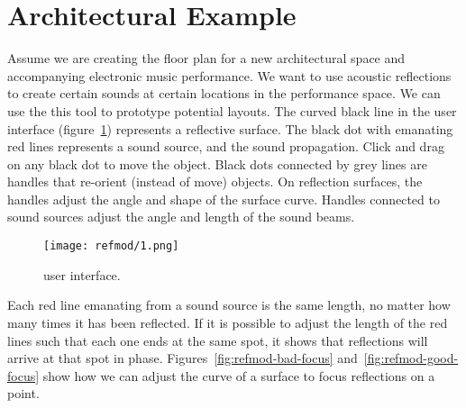 \section{ Architectural Example}
\label{sec:refmod-user-interf}
Assume we are creating the floor plan for a new architectural space
and accompanying electronic music performance. We want to use acoustic
reflections to create certain sounds at certain locations in the
performance space. We can use the this tool to prototype potential
layouts. The curved black line in the user interface
(figure~\ref{fig:refmod-simple}) represents a reflective surface. The
black dot with emanating red lines represents a sound source, and the
sound propagation. Click and drag on any black dot to move the
object. Black dots connected by grey lines are handles that
re-orient (instead of move) objects. On reflection surfaces, the handles
adjust the angle and shape of the surface curve. Handles connected to
sound sources adjust the angle and length of the sound beams. 
\begin{figure}[]
  \texttt{[image: refmod/1.png]}
  \caption[]{ user interface.}
  \label{fig:refmod-simple}
\end{figure}
Each red line emanating from a sound source is the same length, no
matter how many times it has been reflected. If it is possible to
adjust the length of the red lines such that each one ends at the same
spot, it shows that reflections will arrive at that spot in
phase. Figures~\ref{fig:refmod-bad-focus}
and~\ref{fig:refmod-good-focus} show how we can adjust the curve of a
surface to focus reflections on a point.

